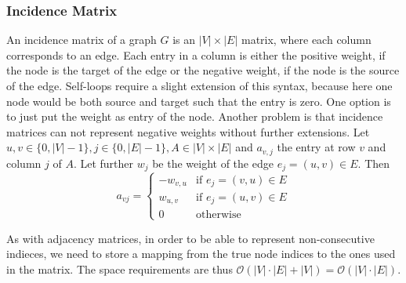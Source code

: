         \subsubsection*{Incidence Matrix}
        An incidence matrix of a graph $G$ is an $|V| \times |E|$ matrix, where each column corresponds to an edge. Each entry in a column is either the positive weight, if the node is the target of the edge or the negative weight, if the node is the source of the edge. Self-loops require a slight extension of this syntax, because here one node would be both source and target such that the entry is zero. One option is to just put the weight as entry of the node.  Another problem is that incidence matrices can not represent negative weights without further extensions.        
        Let $u,v \in \{0, |V|-1\}, j \in \{0, |E|-1\}, A \in |V| \times |E|$ and $a_{v,j}$ the entry at row $v$ and column $j$ of $A$. Let further $w_j$ be the weight of the edge $e_j = (u,v) \in E$. Then 
        \[         a_{vj} = \begin{cases}
                     -w_{v,u} & \text{if } e_j = (v,u) \in E \\
                     w_{u,v} & \text{if } e_j = (u,v) \in E \\
                     0 & \text{otherwise}
                    \end{cases}
        \]
        
        As with adjacency matrices, in order to be able to represent non-consecutive indieces, we need to store a mapping from the true node indices to the ones used in the matrix.
        The space requirements are thus $\mathcal{O}(|V| \cdot |E| + |V|) = \mathcal{O}(|V| \cdot |E|)$.
        
